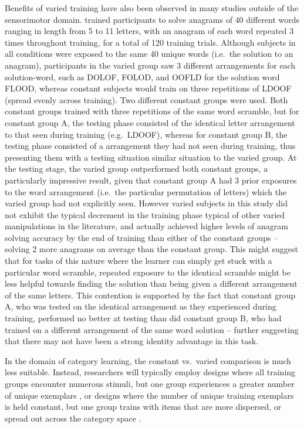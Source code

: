 \documentclass[
  12pt,
  letterpaper,
]{article}
\begin{document}
Benefits of varied training have also been observed in many studies
outside of the sensorimotor domain.
\textcite{goodeSuperiorityVariableRepeated2008} trained participants to
solve anagrams of 40 different words ranging in length from 5 to 11
letters, with an anagram of each word repeated 3 times throughout
training, for a total of 120 training trials. Although subjects in all
conditions were exposed to the same 40 unique words (i.e.~the solution
to an anagram), participants in the varied group saw 3 different
arrangements for each solution-word, such as DOLOF, FOLOD, and OOFLD for
the solution word FLOOD, whereas constant subjects would train on three
repetitions of LDOOF (spread evenly across training). Two different
constant groups were used. Both constant groups trained with three
repetitions of the same word scramble, but for constant group A, the
testing phase consisted of the identical letter arrangement to that seen
during training (e.g.~LDOOF), whereas for constant group B, the testing
phase consisted of a arrangement they had not seen during training, thus
presenting them with a testing situation similar situation to the varied
group. At the testing stage, the varied group outperformed both constant
groups, a particularly impressive result, given that constant group A
had 3 prior exposures to the word arrangement (i.e.~the particular
permutation of letters) which the varied group had not explicitly seen.
However varied subjects in this study did not exhibit the typical
decrement in the training phase typical of other varied manipulations in
the literature, and actually achieved higher levels of anagram solving
accuracy by the end of training than either of the constant groups --
solving 2 more anagrams on average than the constant group. This might
suggest that for tasks of this nature where the learner can simply get
stuck with a particular word scramble, repeated exposure to the
identical scramble might be less helpful towards finding the solution
than being given a different arrangement of the same letters. This
contention is supported by the fact that constant group A, who was
tested on the identical arrangement as they experienced during training,
performed no better at testing than did constant group B, who had
trained on a different arrangement of the same word solution -- further
suggesting that there may not have been a strong identity advantage in
this task.

In the domain of category learning, the constant vs.~varied comparison
is much less suitable. Instead, researchers will typically employ
designs where all training groups encounter numerous stimuli, but one
group experiences a greater number of unique exemplars
\autocite{wahlheimMetacognitiveJudgmentsRepetition2012,nosofskyModelguidedSearchOptimal2019,doyleMetacognitiveMonitoringCategory2016,hoschPriorExperienceVariability2023,brunsteinPreparingNoveltyDiverse2011},
or designs where the number of unique training exemplars is held
constant, but one group trains with items that are more dispersed, or
spread out across the category space
\autocite{posnerGenesisAbstractIdeas1968,homaCategoryBreadthAbstraction1976,huHighvariabilityTrainingDoes2024,bowmanTrainingSetCoherence2020,maddoxStimulusRangeDiscontinuity2011}.
\end{document}
